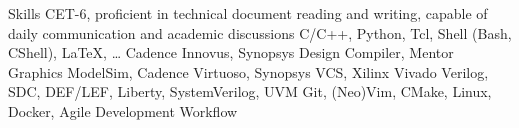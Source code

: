 
\begin{rubric}{Skills}
	\entry*[Languages]
	CET-6, proficient in technical document reading and writing, capable of daily communication and academic discussions
	C/C++, Python, Tcl, Shell (Bash, CShell), \LaTeX, \ldots
	Cadence Innovus, Synopsys Design Compiler, Mentor Graphics ModelSim, Cadence Virtuoso, Synopsys VCS, Xilinx Vivado
	Verilog, SDC, DEF/LEF, Liberty, SystemVerilog, UVM
	\entry*[Misc.]
	Git, (Neo)Vim, CMake, Linux, Docker, Agile Development Workflow
\end{rubric}
